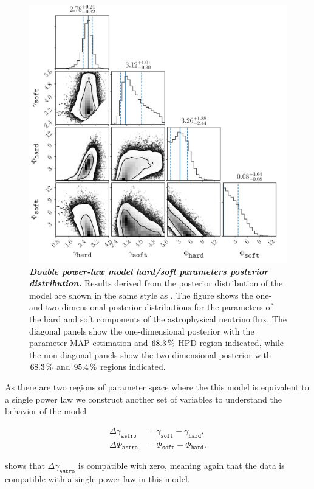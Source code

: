 \begin{figure}
	\centering
	\includegraphics[width=\linewidth]{figures/hese_paper/dpl_flat_hardsoft_vars}
	\internallinenumbers
	\caption{\textbf{\textit{Double power-law model hard/soft parameters posterior distribution.}}
		Results derived from the posterior distribution of the model are shown in the same style as .
		The figure shows the one- and two-dimensional posterior distributions for the parameters of the hard and soft components of the astrophysical neutrino flux.
		The diagonal panels show the one-dimensional posterior with the parameter MAP estimation and $\SI{68.3}\percent$ HPD region indicated, while the non-diagonal panels show the two-dimensional posterior with $\SI{68.3}\percent$ and $\SI{95.4}\percent$ regions indicated.}\label{fig:dpl_posterior}
\end{figure}

As there are two regions of parameter space where the this model is equivalent to a single power law we construct another set of variables to understand the behavior of the model
\begin{linenomath*}
	\begin{equation}
	\begin{split}
	\Delta\gamma_\texttt{astro} &= \gamma_\texttt{soft} - \gamma_\texttt{hard}, \\
	\Delta\Phi_\texttt{astro} &= \Phi_\texttt{soft} - \Phi_\texttt{hard}.
	\end{split}\label{eq:dpl_delta}
	\end{equation}
\end{linenomath*}
 shows that $\Delta\gamma_\texttt{astro}$ is compatible with zero, meaning again that the data is compatible with a single power law in this model.


